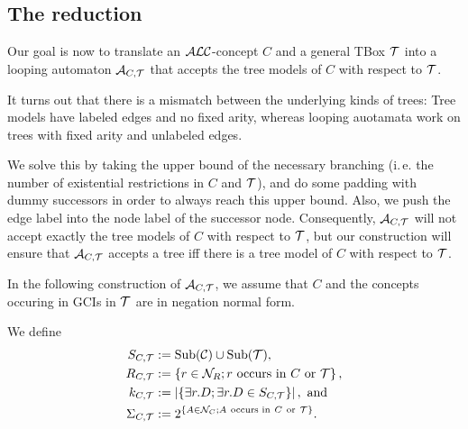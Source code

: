 \documentclass[openany]{scrbook}
\theoremstyle{break}
\theoremstyle{nonumberbreak}
\theoremstyle{nonumberplain}
\theoremstyle{nonumberbreak}
\newcommand{\then}{\Longrightarrow}
\newcommand{\abs}[2][]{\left|{#2}\right|\ifx#1\then\else_{#1}\fi}
\newcommand{\set}[1]{\left\{#1\right\}}
\newcommand{\powerset}[1]{2^{\left\{{#1}\right\}}}
\newcommand{\ie}{i{.}\,e{.}\xspace}
\newcommand{\Sub}{\operatorname{Sub}}
\newcommand{\ALC}{{\cal A}{\cal L}{\cal C}}
\begin{document}
\subsection{The reduction}
Our goal is now to translate an $\ALC$-concept $C$ and a general TBox
${\cal T}$ into a looping automaton ${\cal A}_{C, {\cal T}}$ that
accepts the tree models of $C$ with respect to ${\cal T}$.

It turns out that there is a mismatch between the underlying kinds of
trees: Tree models have labeled edges and no fixed arity, whereas
looping auotamata work on trees with fixed arity and unlabeled edges.

We solve this by taking the upper bound of the necessary branching
(\ie the number of existential restrictions in $C$ and ${\cal T}$),
and do some padding with dummy successors in order to always reach
this upper bound. Also, we push the edge label into the node label of
the successor node. Consequently, ${\cal A}_{C, {\cal T}}$ will not
accept exactly the tree models of $C$ with respect to ${\cal T}$, but
our construction will ensure that ${\cal A}_{C, {\cal T}}$ accepts a
tree iff there is a tree model of $C$ with respect to ${\cal T}$.

In the following construction of ${\cal A}_{C, {\cal T}}$, we assume
that $C$ and the concepts occuring in GCIs in ${\cal T}$ are in
negation normal form.

We define
\begin{align*}
  S_{C, {\cal T}} & := \Sub({\cal C}) \cup \Sub({\cal T}), \\
  R_{C, {\cal T}} & := \set{r \in {\cal N}_R; r\ \text{occurs in}\ C\
    \text{or}\ {\cal T}}, \\
  k_{C, {\cal T}} & := \abs{\set{\exists r.D; \exists r.D \in S_{C,
        {\cal T}}}},\ \text{and} \\
  \Sigma_{C, {\cal T}} & := \powerset{A \in {\cal N}_C; A\
    \text{occurs in}\ C\ \text{or}\ {\cal T}}.
\end{align*}
\end{document}
